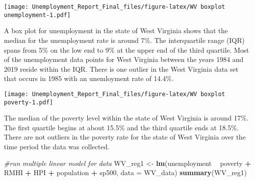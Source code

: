 \documentclass[
]{article}
\newenvironment{Shaded}{\begin{snugshade}}{\end{snugshade}}
\newcommand{\CharTok}[1]{\textcolor[rgb]{0.31,0.60,0.02}{#1}}
\newcommand{\CommentTok}[1]{\textcolor[rgb]{0.56,0.35,0.01}{\textit{#1}}}
\newcommand{\DataTypeTok}[1]{\textcolor[rgb]{0.13,0.29,0.53}{#1}}
\newcommand{\DecValTok}[1]{\textcolor[rgb]{0.00,0.00,0.81}{#1}}
\newcommand{\KeywordTok}[1]{\textcolor[rgb]{0.13,0.29,0.53}{\textbf{#1}}}
\newcommand{\NormalTok}[1]{#1}
\newcommand{\OperatorTok}[1]{\textcolor[rgb]{0.81,0.36,0.00}{\textbf{#1}}}
\newcommand{\StringTok}[1]{\textcolor[rgb]{0.31,0.60,0.02}{#1}}
\begin{document}
\texttt{[image: Unemployment\_Report\_Final\_files/figure-latex/WV boxplot unemployment-1.pdf]}

A box plot for unemployment in the state of West Virginia shows that the
median for the unemployment rate is around 7\%. The interquartile range
(IQR) spans from 5\% on the low end to 9\% at the upper end of the third
quartile. Most of the unemployment data points for West Virginia between
the years 1984 and 2019 reside within the IQR. There is one outlier in
the West Virginia data set that occurs in 1985 with an unemloyment rate
of 14.4\%.

\begin{Shaded}
\end{Shaded}

\texttt{[image: Unemployment\_Report\_Final\_files/figure-latex/WV boxplot poverty-1.pdf]}

The median of the poverty level within the state of West Virginia is
around 17\%. The first quartile begins at about 15.5\% and the third
quartile ends at 18.5\%. There are not outliers in the poverty rate for
the state of West Virginia over the time period the data was collected.

\begin{Shaded}
\begin{Highlighting}[]
\CommentTok{#run multiple linear model for data}
\NormalTok{WV_reg1 <-}\StringTok{ }\KeywordTok{lm}\NormalTok{(unemployment }\OperatorTok{~}\StringTok{ }\NormalTok{poverty }\OperatorTok{+}\StringTok{ }\NormalTok{RMHI }\OperatorTok{+}\StringTok{ }\NormalTok{HPI }\OperatorTok{+}\StringTok{ }\NormalTok{population }\OperatorTok{+}\StringTok{ }\NormalTok{sp500, }\DataTypeTok{data =}\NormalTok{ WV_data)}
\KeywordTok{summary}\NormalTok{(WV_reg1)}
\end{Highlighting}
\end{Shaded}
\end{document}
